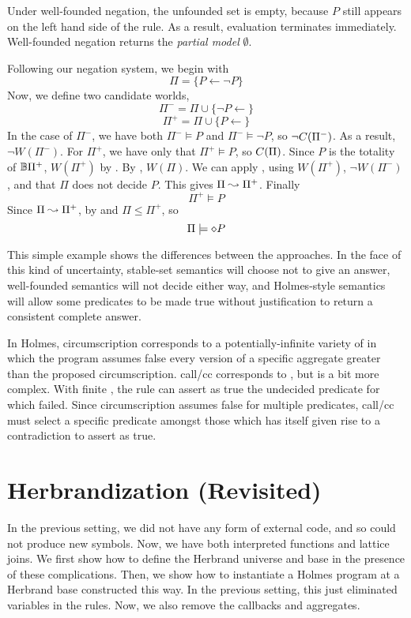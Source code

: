 Under well-founded negation, the unfounded set is empty, because $P$ still appears on the left hand side of the rule.
As a result, evaluation terminates immediately.
Well-founded negation returns the \emph{partial model} $\emptyset$.

Following our negation system, we begin with
\[\Pi = \{P \leftarrow \neg P\}\]
Now, we define two candidate worlds,
\[\Pi^- = \Pi \cup \{\neg P \leftarrow\}\]
\[\Pi^+ = \Pi \cup \{P \leftarrow\}\]
In the case of $\Pi^-$, we have both $\Pi^- \models P$ and $\Pi^- \models \neg P$, so $\neg C(\Pi^-)$.
As a result, $\neg W(\Pi^-)$.
For $\Pi^+$, we have only that $\Pi^+ \models P$, so $C(\Pi)$.
Since $P$ is the totality of $\mathbb{B}{\Pi^+}$, $W(\Pi^+)$ by .
By , $W(\Pi)$.
We can apply , using $W(\Pi^+)$, $\neg W(\Pi^-)$, and that $\Pi$ does not decide $P$.
This gives $\Pi \leadsto \Pi^+$.
Finally
\[
	\Pi^+ \models P
\]
Since $\Pi \leadsto \Pi^+$, by  and  $\Pi \leq \Pi^+$, so
\[
	\Pi \models \diamond P
\]

This simple example shows the differences between the approaches.
In the face of this kind of uncertainty, stable-set semantics will choose not to give an answer, well-founded semantics will not decide either way, and Holmes-style semantics will allow some predicates to be made true without justification to return a consistent complete answer. 

In Holmes, circumscription corresponds to a potentially-infinite variety of  in which the program assumes false every version of a specific aggregate greater than the proposed circumscription.
call/cc corresponds to , but is a bit more complex.
With finite , the  rule can assert as true the undecided predicate for which  failed.
Since circumscription assumes false for multiple predicates, call/cc must select a specific predicate amongst those which has itself given rise to a contradiction to assert as true.

\section{Herbrandization (Revisited)}
\label{formal:sec:herbrand}
In the previous setting, we did not have any form of external code, and so could not produce new symbols.
Now, we have both interpreted functions and lattice joins.
We first show how to define the Herbrand universe and base in the presence of these complications.
Then, we show how to instantiate a Holmes program at a Herbrand base constructed this way.
In the previous setting, this just eliminated variables in the rules.
Now, we also remove the callbacks and aggregates.

